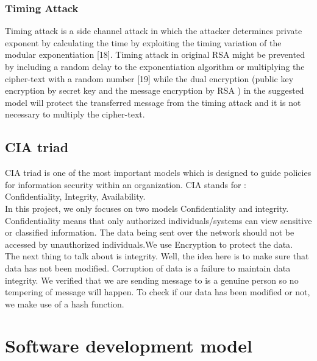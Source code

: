 \subsubsection{Timing Attack}
Timing attack is a side channel attack in which the attacker
determines private exponent by calculating the time by
exploiting the timing variation of the modular exponentiation
	[18]. Timing attack in original RSA might be prevented by
including a random delay to the exponentiation algorithm or
multiplying the cipher-text with a random number [19] while
the dual encryption (public key encryption by secret key and
the message encryption by RSA ) in the suggested model
will protect the transferred message from the timing attack and
it is not necessary to multiply the cipher-text.

\pagebreak
\subsection{CIA triad}
CIA triad is one of the most important models which is designed to guide policies
for information security within an organization.
CIA stands for :\\
Confidentiality,
Integrity,
Availability.\\
In this project, we only focuses on two models Confidentiality and 	integrity.\\
Confidentiality means that only authorized individuals/systems can view sensitive or classified information. The data being sent over the network should not be accessed by unauthorized individuals.We use Encryption to protect the data.\\

The next thing to talk about is integrity. Well, the idea here is to make sure that data has not been modified. Corruption of data is a failure to maintain data integrity. We verified that we are sending message to is a genuine person so no tempering of message will happen. To check if our data has been modified or not, we make use of a hash function.




\pagebreak
\section{Software development model}
